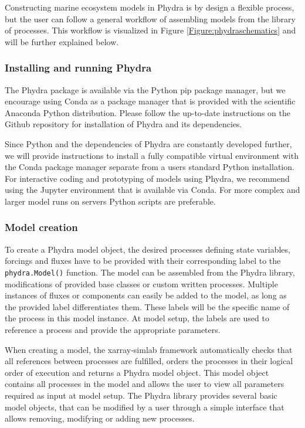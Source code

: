 \documentclass[journal abbreviations, manuscript]{copernicus}
\begin{document}
Constructing marine ecosystem models in Phydra is by design a flexible process, but the user can follow a general workflow of assembling models from the library of processes. This workflow is visualized in Figure \ref{Figure:phydraschematics} and will be further explained below.

\subsubsection{Installing and running Phydra}
The Phydra package is available via the Python pip package manager, but we encourage using Conda as a package manager that is provided with the scientific Anaconda Python distribution.
Please follow the up-to-date instructions on the Github repository for installation of Phydra and its dependencies.

Since Python and the dependencies of Phydra are constantly developed further, we will provide instructions to install a fully compatible virtual environment with the Conda package manager separate from a users standard Python installation. For interactive coding and prototyping of models using Phydra, we recommend using the Jupyter environment that is available via Conda. For more complex and larger model runs on servers Python scripts are preferable.


\subsubsection{Model creation}

To create a Phydra model object, the desired processes defining state variables, forcings and fluxes have to be provided with their corresponding label to the \texttt{phydra.Model()} function.
The model can be assembled from the Phydra library, modifications of provided base classes or custom written processes. Multiple instances of fluxes or components can easily be added to the model, as long as the provided label differentiates them.
These labels will be the specific name of the process in this model instance. At model setup, the labels are used to reference a process and provide the appropriate parameters.

When creating a model, the xarray-simlab framework automatically checks that all references between processes are fulfilled, orders the processes in their logical order of execution and returns a Phydra model object. This model object contains all processes in the model and allows the user to view all parameters required as input at model setup. The Phydra library provides several basic model objects, that can be modified by a user through a simple interface that allows removing, modifying or adding new processes.
\end{document}
